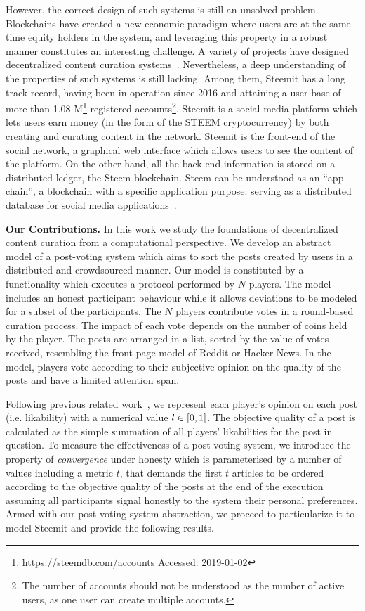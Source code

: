   However, the correct design of such systems is still an unsolved problem.
  Blockchains have created a new economic paradigm where users are at the same
  time equity holders in the system, and leveraging this property in a robust
  manner constitutes an interesting challenge. A variety of projects have
  designed decentralized content curation systems~\cite{synereo,steemit,tcr}.
  Nevertheless, a deep understanding of the properties of such systems is still
  lacking. Among them, Steemit has a long track record, having been in operation
  since 2016 and attaining a user base of more than 1.08
  M\footnote{\url{https://steemdb.com/accounts} Accessed: 2019-01-02} registered
  accounts\footnote{The number of accounts should not be understood as the
  number of active users, as one user can create multiple accounts.}. Steemit is
  a social media platform which lets users earn money (in the form of the STEEM
  cryptocurrency) by both creating and curating content in the network. Steemit
  is the front-end of the social network, a graphical web interface which allows
  users to see the content of the platform. On the other hand, all the back-end
  information is stored on a distributed ledger, the Steem blockchain. Steem can
  be understood as an ``app-chain'', a blockchain with a specific application
  purpose: serving as a distributed database for social media
  applications~\cite{steemit}.

  \noindent  \textbf{Our Contributions.} In this work we study the foundations
  of decentralized content curation from a computational perspective. We develop
  an abstract model of a post-voting system which aims to sort the posts created
  by users in a distributed and crowdsourced manner. Our model is constituted by
  a functionality which executes a protocol performed by $N$ players. The model
  includes an honest participant behaviour while it allows deviations to be
  modeled for a subset of the participants. The $N$ players contribute votes in
  a round-based curation process. The impact of each vote depends on the number
  of coins held by the player. The posts are arranged in a list, sorted by the
  value of votes received, resembling the front-page model of Reddit or Hacker
  News. In the model, players vote according to their subjective opinion on the
  quality of the posts and have a limited attention span.

  Following previous related
  work~\cite{ghosh2011incentivizing,askalidis2013theoretical}, we represent each
  player's opinion on each post (i.e. likability) with a numerical value $l
  \in [ 0,1 ]$. The objective quality of a post is calculated as the simple
  summation of all players' likabilities for the post in question. To measure
  the effectiveness of a post-voting system, we introduce the property of
  \textit{convergence} under honesty which is parameterised by a number of
  values including a metric $t$, that demands the first $t$ articles to be
  ordered according to the objective quality of the posts at the end of the
  execution assuming all participants signal honestly to the system their
  personal preferences. Armed with our post-voting system abstraction, we
  proceed to particularize it to model Steemit and provide the following
  results.

